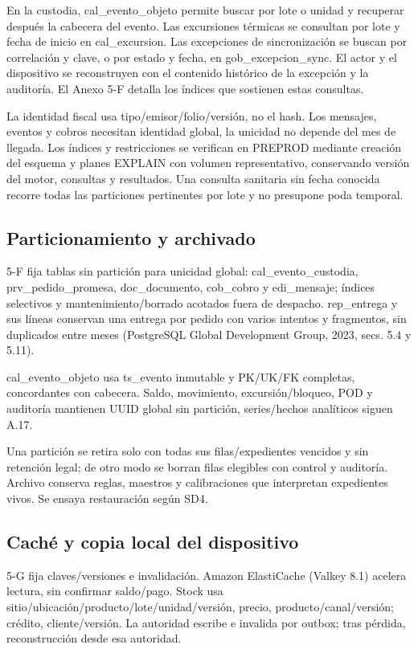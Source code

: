 En la custodia, cal\_evento\_objeto permite buscar por lote o unidad y recuperar después la cabecera del evento. Las excursiones térmicas se consultan por lote y fecha de inicio en cal\_excursion. Las excepciones de sincronización se buscan por correlación y clave, o por estado y fecha, en gob\_excepcion\_sync. El actor y el dispositivo se reconstruyen con el contenido histórico de la excepción y la auditoría. El Anexo 5-F detalla los índices que sostienen estas consultas.

La identidad fiscal usa tipo/emisor/folio/versión, no el hash. Los mensajes, eventos y cobros necesitan identidad global, la unicidad no depende del mes de llegada. Los índices y restricciones se verifican en PREPROD mediante creación del esquema y planes EXPLAIN con volumen representativo, conservando versión del motor, consultas y resultados. Una consulta sanitaria sin fecha conocida recorre todas las particiones pertinentes por lote y no presupone poda temporal.

\subsection{Particionamiento y archivado}
\label{sec:sd5-5-4-3}

5-F fija tablas sin partición para unicidad global: cal\_evento\_custodia, prv\_pedido\_promesa, doc\_documento, cob\_cobro y edi\_mensaje; índices selectivos y mantenimiento/borrado acotados fuera de despacho. rep\_entrega y sus líneas conservan una entrega por pedido con varios intentos y fragmentos, sin duplicados entre meses (PostgreSQL Global Development Group, 2023, secs. 5.4 y 5.11).

cal\_evento\_objeto usa ts\_evento inmutable y PK/UK/FK completas, concordantes con cabecera. Saldo, movimiento, excursión/bloqueo, POD y auditoría mantienen UUID global sin partición, series/hechos analíticos siguen A.17.

Una partición se retira solo con todas sus filas/expedientes vencidos y sin retención legal; de otro modo se borran filas elegibles con control y auditoría. Archivo conserva reglas, maestros y calibraciones que interpretan expedientes vivos. Se ensaya restauración según SD4.

\subsection{Caché y copia local del dispositivo}
\label{sec:sd5-5-4-4}

5-G fija claves/versiones e invalidación. Amazon ElastiCache (Valkey 8.1) acelera lectura, sin confirmar saldo/pago. Stock usa sitio/ubicación/producto/lote/unidad/versión, precio, producto/canal/versión; crédito, cliente/versión. La autoridad escribe e invalida por outbox; tras pérdida, reconstrucción desde esa autoridad.

